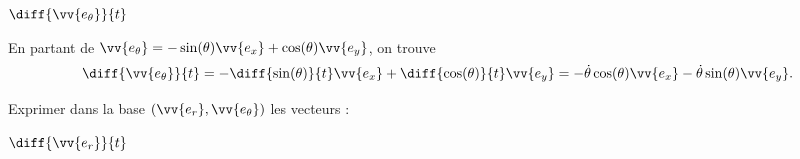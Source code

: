 \begin{enonce}
	$\diff{\vv{e_\theta}}{t}$
\end{enonce}


\begin{corrige}
 En partant de $\vv{e_\theta}=- \sin(\theta) \vv{e_x} + \cos (\theta) \vv{e_y}$, on trouve  
 \[
 \diff{\vv{e_\theta}}{t}=-\diff{\sin(\theta)}{t}\vv{e_x}+\diff{\cos(\theta)}{t}\vv{e_y}=-\dot{\theta}\cos(\theta) \vv{e_x} - \dot{\theta}\sin (\theta) \vv{e_y}.
 \]
\end{corrige}

\finEntrainement


\newpage


\hauteurLargeurCadreReponse		{7mm}{4.5cm}
\initialisationEntrainement


Exprimer dans la base $(\vv{e_r}, \vv{e_\theta})$ les vecteurs : 

\debutEntrainement


\begin{enonce}
	$\diff{\vv{e_r}}{t}$
\end{enonce}


